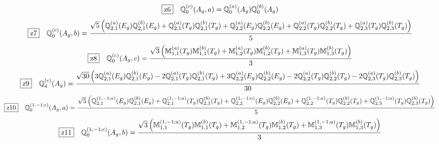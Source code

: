 \documentclass[fleqn,10pt,landscape]{jsarticle}
\begin{document}
\begin{dmath*}
\hspace*{3mm}\fbox{z6}\quad \mathbb{Q}_{0}^{(c)}(A_{g},a)=\mathbb{Q}_{0}^{(a)}(A_{g}) \mathbb{Q}_{0}^{(b)}(A_{g})
\end{dmath*}
\begin{dmath*}
\hspace*{3mm}\fbox{z7}\quad \mathbb{Q}_{0}^{(c)}(A_{g},b)=\frac{\sqrt{5} \left(\mathbb{Q}_{2,1}^{(a)}(E_{g}) \mathbb{Q}_{2,1}^{(b)}(E_{g}) + \mathbb{Q}_{2,1}^{(a)}(T_{g}) \mathbb{Q}_{2,1}^{(b)}(T_{g}) + \mathbb{Q}_{2,2}^{(a)}(E_{g}) \mathbb{Q}_{2,2}^{(b)}(E_{g}) + \mathbb{Q}_{2,2}^{(a)}(T_{g}) \mathbb{Q}_{2,2}^{(b)}(T_{g}) + \mathbb{Q}_{2,3}^{(a)}(T_{g}) \mathbb{Q}_{2,3}^{(b)}(T_{g})\right)}{5}
\end{dmath*}
\begin{dmath*}
\hspace*{3mm}\fbox{z8}\quad \mathbb{Q}_{0}^{(c)}(A_{g},c)=\frac{\sqrt{3} \left(\mathbb{M}_{1,1}^{(a)}(T_{g}) \mathbb{M}_{1,1}^{(b)}(T_{g}) + \mathbb{M}_{1,2}^{(a)}(T_{g}) \mathbb{M}_{1,2}^{(b)}(T_{g}) + \mathbb{M}_{1,3}^{(a)}(T_{g}) \mathbb{M}_{1,3}^{(b)}(T_{g})\right)}{3}
\end{dmath*}
\begin{dmath*}
\hspace*{3mm}\fbox{z9}\quad \mathbb{Q}_{4}^{(c)}(A_{g})=\frac{\sqrt{30} \left(3 \mathbb{Q}_{2,1}^{(a)}(E_{g}) \mathbb{Q}_{2,1}^{(b)}(E_{g}) - 2 \mathbb{Q}_{2,1}^{(a)}(T_{g}) \mathbb{Q}_{2,1}^{(b)}(T_{g}) + 3 \mathbb{Q}_{2,2}^{(a)}(E_{g}) \mathbb{Q}_{2,2}^{(b)}(E_{g}) - 2 \mathbb{Q}_{2,2}^{(a)}(T_{g}) \mathbb{Q}_{2,2}^{(b)}(T_{g}) - 2 \mathbb{Q}_{2,3}^{(a)}(T_{g}) \mathbb{Q}_{2,3}^{(b)}(T_{g})\right)}{30}
\end{dmath*}
\begin{dmath*}
\hspace*{3mm}\fbox{z10}\quad \mathbb{Q}_{0}^{(1,-1;c)}(A_{g},a)=\frac{\sqrt{5} \left(\mathbb{Q}_{2,1}^{(1,-1;a)}(E_{g}) \mathbb{Q}_{2,1}^{(b)}(E_{g}) + \mathbb{Q}_{2,1}^{(1,-1;a)}(T_{g}) \mathbb{Q}_{2,1}^{(b)}(T_{g}) + \mathbb{Q}_{2,2}^{(1,-1;a)}(E_{g}) \mathbb{Q}_{2,2}^{(b)}(E_{g}) + \mathbb{Q}_{2,2}^{(1,-1;a)}(T_{g}) \mathbb{Q}_{2,2}^{(b)}(T_{g}) + \mathbb{Q}_{2,3}^{(1,-1;a)}(T_{g}) \mathbb{Q}_{2,3}^{(b)}(T_{g})\right)}{5}
\end{dmath*}
\begin{dmath*}
\hspace*{3mm}\fbox{z11}\quad \mathbb{Q}_{0}^{(1,-1;c)}(A_{g},b)=\frac{\sqrt{3} \left(\mathbb{M}_{1,1}^{(1,-1;a)}(T_{g}) \mathbb{M}_{1,1}^{(b)}(T_{g}) + \mathbb{M}_{1,2}^{(1,-1;a)}(T_{g}) \mathbb{M}_{1,2}^{(b)}(T_{g}) + \mathbb{M}_{1,3}^{(1,-1;a)}(T_{g}) \mathbb{M}_{1,3}^{(b)}(T_{g})\right)}{3}
\end{dmath*}
\end{document}
